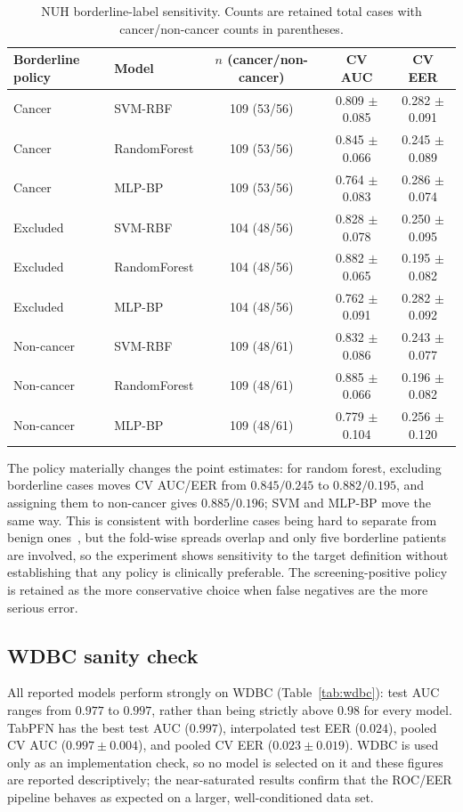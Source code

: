 \documentclass[11pt,a4paper]{article}
\begin{document}
\begin{table}[htbp]
\centering\footnotesize
\caption{NUH borderline-label sensitivity. Counts are retained total cases with cancer/non-cancer counts in parentheses.}
\label{tab:borderline}
\setlength{\tabcolsep}{7pt}
\begin{tabular}{llccc}
\toprule
Borderline policy & Model & $n$ (cancer/non-cancer) & CV AUC & CV EER \\
\midrule
Cancer & SVM-RBF & 109 (53/56) & 0.809 $\pm$ 0.085 & 0.282 $\pm$ 0.091 \\
Cancer & RandomForest & 109 (53/56) & 0.845 $\pm$ 0.066 & 0.245 $\pm$ 0.089 \\
Cancer & MLP-BP & 109 (53/56) & 0.764 $\pm$ 0.083 & 0.286 $\pm$ 0.074 \\
Excluded & SVM-RBF & 104 (48/56) & 0.828 $\pm$ 0.078 & 0.250 $\pm$ 0.095 \\
Excluded & RandomForest & 104 (48/56) & 0.882 $\pm$ 0.065 & 0.195 $\pm$ 0.082 \\
Excluded & MLP-BP & 104 (48/56) & 0.762 $\pm$ 0.091 & 0.282 $\pm$ 0.092 \\
Non-cancer & SVM-RBF & 109 (48/61) & 0.832 $\pm$ 0.086 & 0.243 $\pm$ 0.077 \\
Non-cancer & RandomForest & 109 (48/61) & 0.885 $\pm$ 0.066 & 0.196 $\pm$ 0.082 \\
Non-cancer & MLP-BP & 109 (48/61) & 0.779 $\pm$ 0.104 & 0.256 $\pm$ 0.120 \\
\bottomrule
\end{tabular}
\end{table}

The policy materially changes the point estimates: for random forest, excluding borderline cases moves CV AUC/EER from $0.845/0.245$ to $0.882/0.195$, and assigning them to non-cancer gives $0.885/0.196$; SVM and MLP-BP move the same way. This is consistent with borderline cases being hard to separate from benign ones~\cite{tan2008}, but the fold-wise spreads overlap and only five borderline patients are involved, so the experiment shows sensitivity to the target definition without establishing that any policy is clinically preferable. The screening-positive policy is retained as the more conservative choice when false negatives are the more serious error.

\FloatBarrier
\subsection{WDBC sanity check}
All reported models perform strongly on WDBC (Table~\ref{tab:wdbc}): test AUC ranges from $0.977$ to $0.997$, rather than being strictly above $0.98$ for every model. TabPFN has the best test AUC ($0.997$), interpolated test EER ($0.024$), pooled CV AUC ($0.997\pm0.004$), and pooled CV EER ($0.023\pm0.019$). WDBC is used only as an implementation check, so no model is selected on it and these figures are reported descriptively; the near-saturated results confirm that the ROC/EER pipeline behaves as expected on a larger, well-conditioned data set.
\end{document}
